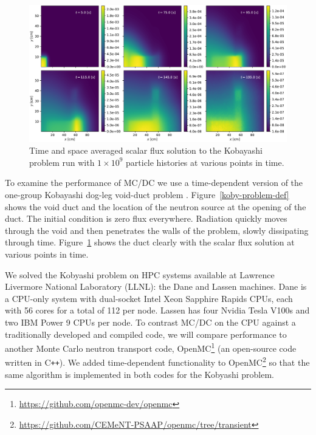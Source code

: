 \begin{figure}[h]
    \centerline{
    \includegraphics[width=\textwidth]{monte_carlo/cise_paper/cise_figs/koby.pdf}
    } 
    \caption{Time and space averaged scalar flux solution to the Kobayashi problem run with $1\times 10^{9}$ particle histories at various points in time.}
    \label{koby-results}
\end{figure}

To examine the performance of MC/DC we use a time-dependent version of the one-group Kobayashi dog-leg void-duct problem \cite{Kobayashi2001, variansyah_mc23_mcdc}.
Figure~\ref{koby-problem-def} shows the void duct and the location of the neutron source at the opening of the duct.
The initial condition is zero flux everywhere.
Radiation quickly moves through the void and then penetrates the walls of the problem, slowly dissipating through time.
Figure~\ref{koby-results} shows the duct clearly with the scalar flux solution at various points in time.

We solved the Kobyashi problem on HPC systems available at Lawrence Livermore National Laboratory (LLNL): the Dane and Lassen machines.
Dane is a CPU-only system with dual-socket Intel Xeon Sapphire Rapids CPUs, each with 56 cores for a total of 112 per node.
Lassen has four Nvidia Tesla V100s and two IBM Power 9 CPUs per node.
To contrast MC/DC on the CPU against a traditionally developed and compiled code, we will compare performance to another Monte Carlo neutron transport code, OpenMC\footnote{\url{https://github.com/openmc-dev/openmc}} \cite{romano_openmc_2015} (an open-source code written in C\texttt{++}).
We added time-dependent functionality to OpenMC\footnote{\url{https://github.com/CEMeNT-PSAAP/openmc/tree/transient}} so that the same algorithm is implemented in both codes for the Kobyashi problem.


